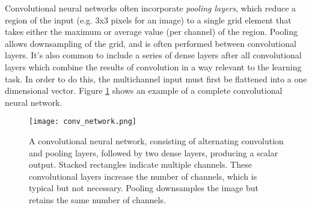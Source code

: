 Convolutional neural networks often incorporate \textit{pooling layers}, which reduce a region of the input (e.g. 3x3 pixels for an image) to a single grid element that takes either the maximum or average value (per channel) of the region. 
Pooling allows downsampling of the grid, and is often performed between convolutional layers. 
It's also common to include a series of dense layers after all convolutional layers which combine the results of convolution in a way relevant to the learning task.
In order to do this, the multichannel input must first be flattened into a one dimensional vector.
Figure \ref{fig:conv_network} shows an example of a complete convolutional neural network.

\begin{figure}
	\centering
	\texttt{[image: conv\_network.png]}
	\caption{A convolutional neural network, consisting of alternating convolution and pooling layers, followed by two dense layers, producing a scalar output. Stacked rectangles indicate multiple channels. These convolutional layers increase the number of channels, which is typical but not necessary. Pooling downsamples the image but retains the same number of channels.}
	\label{fig:conv_network}
\end{figure}


